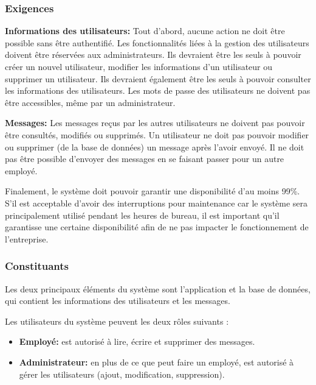 \documentclass{article}
\begin{document}
\hypertarget{exigences}{%
\subsubsection{Exigences}\label{exigences}}

\textbf{Informations des utilisateurs:} Tout d'abord, aucune action ne
doit être possible sans être authentifié. Les fonctionnalités liées à la
gestion des utilisateurs doivent être réservées aux administrateurs. Ils
devraient être les seuls à pouvoir créer un nouvel utilisateur, modifier
les informations d'un utilisateur ou supprimer un utilisateur. Ils
devraient également être les seuls à pouvoir consulter les informations
des utilisateurs. Les mots de passe des utilisateurs ne doivent pas être
accessibles, même par un administrateur.

\textbf{Messages:} Les messages reçus par les autres utilisateurs ne
doivent pas pouvoir être consultés, modifiés ou supprimés. Un
utilisateur ne doit pas pouvoir modifier ou supprimer (de la base de
données) un message après l'avoir envoyé. Il ne doit pas être possible
d'envoyer des messages en se faisant passer pour un autre employé.

Finalement, le système doit pouvoir garantir une disponibilité d'au
moins 99\%. S'il est acceptable d'avoir des interruptions pour
maintenance car le système sera principalement utilisé pendant les
heures de bureau, il est important qu'il garantisse une certaine
disponibilité afin de ne pas impacter le fonctionnement de l'entreprise.

\hypertarget{constituants}{%
\subsubsection{Constituants}\label{constituants}}

Les deux principaux éléments du système sont l'application et la base de
données, qui contient les informations des utilisateurs et les messages.

Les utilisateurs du système peuvent les deux rôles suivants :

\begin{itemize}
\tightlist
\item
  \textbf{Employé:} est autorisé à lire, écrire et supprimer des
  messages.
\item
  \textbf{Administrateur:} en plus de ce que peut faire un employé, est
  autorisé à gérer les utilisateurs (ajout, modification, suppression).
\end{itemize}
\end{document}
